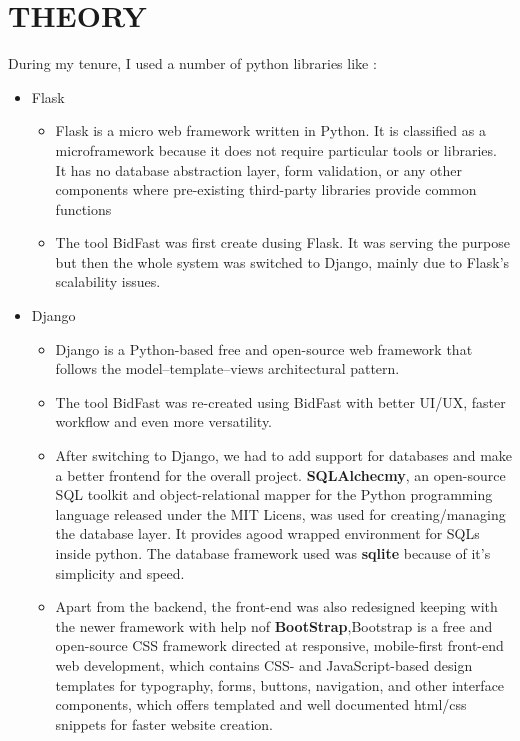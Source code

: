 \documentclass[14pt]{extarticle}
\begin{document}
\section{THEORY}
\par During my tenure, I used a number of python libraries like :
\begin{itemize}
    \item Flask
     \begin{itemize}
        \item \par Flask is a micro web framework written in Python. It is classified as a microframework because it does not require particular tools or libraries. It has no database abstraction layer, form validation, or any other components where pre-existing third-party libraries provide common functions
        \item \par The tool BidFast was first create dusing Flask. It was serving the purpose but then the whole system was switched to Django, mainly due to Flask's scalability issues.
    \end{itemize}
    \item Django
    \begin{itemize}
        \item \par Django is a Python-based free and open-source web framework that follows the model–template–views architectural pattern.
        \item \par The tool BidFast was re-created using BidFast with better UI/UX, faster workflow and even more versatility.
        \item \par After switching to Django, we had to add support for databases and make a better frontend for the overall project. \textbf{SQLAlchecmy}, an open-source SQL toolkit and object-relational mapper for the Python programming language released under the MIT Licens,  was used for creating/managing the database layer. It provides agood wrapped environment for SQLs inside python. The database framework used was \textbf{sqlite} because of it's simplicity and speed.
        \item \par Apart from the backend, the front-end was also redesigned keeping with the newer framework with help nof \textbf{BootStrap},Bootstrap is a free and open-source CSS framework directed at responsive, mobile-first front-end web development, which contains CSS- and JavaScript-based design templates for typography, forms, buttons, navigation, and other interface components, which offers templated and well documented html/css snippets for faster website creation.

\end{itemize}
\end{itemize}
\end{document}

